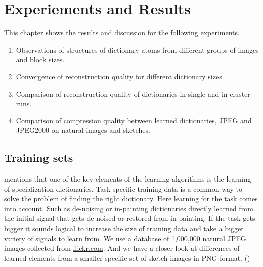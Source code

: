 \chapter{Experiements and Results}

This chapter shows the results and discussion for the following experiments.
\begin{enumerate}
 \item Observations of structures of dictionary atoms from different
groups of images and block sizes.
 \item Convergence of reconstruction quality for different dictionary sizes.
 \item Comparison of reconstruction quality of dictionaries
in single and in cluster runs. 
 \item Comparison of compression quality between learned dictionaries, JPEG
and JPEG2000  on natural images and sketches.
\end{enumerate}

\section{Training sets}
 mentions that one of the key
elements of the learning algorithms is the learning of specialization
dictionaries. Task specific training data is a common way to solve the problem
of finding  the right dictionary. Here learning for the task comes into
account. Such as de-noising or in-painting dictionaries directly learned from
the initial signal that gets de-noised or restored from in-painting. If the task
gets bigger it sounds logical to increase the size of training data and take a
bigger variety of signals to learn from.  We use a database of 1,000,000 natural
JPEG images collected from \url{flickr.com}. And we have a closer look at
differences of learned elements from a smaller specific set of
sketch images in PNG format. ()

